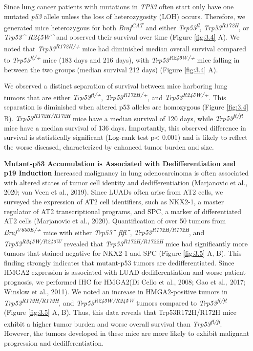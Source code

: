 Since lung cancer patients with mutations in \emph{TP53} often start only have one mutated \emph{p53} allele unless the loss of heterozygosity (LOH) occurs. Therefore, we generated mice heterozygous for both \emph{Braf\textsuperscript{CAT}} and either \emph{Trp53\textsuperscript{fl}}, \emph{Trp53\textsuperscript{R172H}}, or \emph{Trp53\^{} R245W\^{}} and observed their survival over time (Figure \ref{fig:3.4} A). We noted that \emph{Trp53\textsuperscript{R172H/+}} mice had diminished median overall survival compared to \emph{Trp53\textsuperscript{fl/+}} mice (183 days and 216 days), with \emph{Trp53\textsuperscript{R245W/+}} mice falling in between the two groups (median survival 212 days) (Figure \ref{fig:3.4} A).

We observed a distinct separation of survival between mice harboring lung tumors that are either \emph{Trp53\textsuperscript{fl/+}}, \emph{Trp53\textsuperscript{R172H/+}}, and \emph{Trp53\textsuperscript{R245W/+}}. This separation is diminished when altered p53 alleles are homozygous (Figure \ref{fig:3.4} B). \emph{Trp53\textsuperscript{R172H/R172H}} mice have a median survival of 120 days, while \emph{Trp53\textsuperscript{fl/fl}} mice have a median survival of 136 days. Importantly, this observed difference in survival is statistically significant (Log-rank test p\textless{} 0.001) and is likely to reflect the worse diseased, characterized by enhanced tumor burden and size.

\textbf{Mutant-p53 Accumulation is Associated with Dedifferentiation and p19 Induction}
Increased malignancy in lung adenocarcinoma is often associated with altered states of tumor cell identity and dedifferentiation (Marjanovic et al., 2020; van Veen et al., 2019). Since LUADs often arise from AT2 cells, we surveyed the expression of AT2 cell identifiers, such as NKX2-1, a master regulator of AT2 transcriptional programs, and SPC, a marker of differentiated AT2 cells (Marjanovic et al., 2020). Quantification of over 50 tumors from \emph{Braf\textsuperscript{V600E/+}} mice with either \emph{Trp53\^{} flfl\^{}}, \emph{Trp53\textsuperscript{R172H/R172H}}, and \emph{Trp53\textsuperscript{R245W/R245W}} revealed that \emph{Trp53\textsuperscript{R172H/R1722H}} mice had significantly more tumors that stained negative for NKX2-1 and SPC (Figure \ref{fig:3.5} A, B). This finding strongly indicates that mutant-p53 tumors are dedifferentiated. Since HMGA2 expression is associated with LUAD dedifferentiation and worse patient prognosis, we performed IHC for HMGA2(Di Cello et al., 2008; Gao et al., 2017; Winslow et al., 2011). We noted an increase in HMGA2-positive tumors in \emph{Trp53\textsuperscript{R172H/R172H}}, and \emph{Trp53\textsuperscript{R245W/R245W}} tumors compared to \emph{Trp53\textsuperscript{fl/fl}} (Figure \ref{fig:3.5} A, B). Thus, this data reveals that Trp53R172H/R172H mice exhibit a higher tumor burden and worse overall survival than \emph{Trp53\textsuperscript{fl/fl}}. However, the tumors developed in these mice are more likely to exhibit malignant progression and dedifferentiation.

